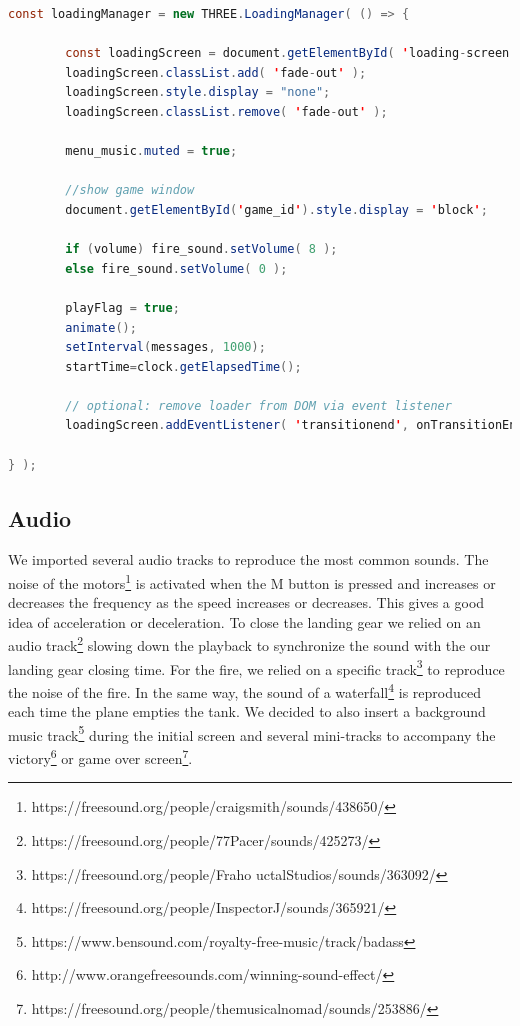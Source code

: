 \documentclass{article}
\begin{document}
\begin{lstlisting}[language=Java, caption=Loading manager]
const loadingManager = new THREE.LoadingManager( () => {
    
        const loadingScreen = document.getElementById( 'loading-screen' );
        loadingScreen.classList.add( 'fade-out' );
        loadingScreen.style.display = "none";
        loadingScreen.classList.remove( 'fade-out' );

        menu_music.muted = true;
        
        //show game window
        document.getElementById('game_id').style.display = 'block';

        if (volume) fire_sound.setVolume( 8 );
        else fire_sound.setVolume( 0 );

        playFlag = true;
        animate();
        setInterval(messages, 1000);
        startTime=clock.getElapsedTime();
        
        // optional: remove loader from DOM via event listener
        loadingScreen.addEventListener( 'transitionend', onTransitionEnd );
        
} );
\end{lstlisting}

\subsection*{Audio}
We imported several audio tracks to reproduce the most common sounds. The noise of the motors\footnote{https://freesound.org/people/craigsmith/sounds/438650/} is activated when the M button is pressed and increases or decreases the frequency as the speed increases or decreases. This gives a good idea of acceleration or deceleration. To close the landing gear we relied on an audio track\footnote{https://freesound.org/people/77Pacer/sounds/425273/} slowing down the playback to synchronize the sound with the our  landing gear closing time. For the fire, we relied on a specific track\footnote{https://freesound.org/people/Fraho uctalStudios/sounds/363092/} to reproduce the noise of the fire. In the same way, the sound of a waterfall\footnote{https://freesound.org/people/InspectorJ/sounds/365921/} is reproduced each time the plane empties the tank. We decided to also insert a background music track\footnote{https://www.bensound.com/royalty-free-music/track/badass} during the initial screen and several mini-tracks to accompany the victory\footnote{http://www.orangefreesounds.com/winning-sound-effect/} or game over screen\footnote{https://freesound.org/people/themusicalnomad/sounds/253886/}. 
\end{document}
